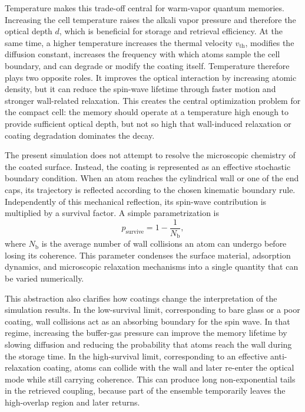 Temperature makes this trade-off central for warm-vapor quantum memories. Increasing the cell temperature raises the alkali vapor pressure and therefore the optical depth \(d\), which is beneficial for storage and retrieval efficiency. At the same time, a higher temperature increases the thermal velocity \(v_{\mathrm{th}}\), modifies the diffusion constant, increases the frequency with which atoms sample the cell boundary, and can degrade or modify the coating itself. Temperature therefore plays two opposite roles. It improves the optical interaction by increasing atomic density, but it can reduce the spin-wave lifetime through faster motion and stronger wall-related relaxation. This creates the central optimization problem for the compact cell: the memory should operate at a temperature high enough to provide sufficient optical depth, but not so high that wall-induced relaxation or coating degradation dominates the decay.

The present simulation does not attempt to resolve the microscopic chemistry of the coated surface. Instead, the coating is represented as an effective stochastic boundary condition. When an atom reaches the cylindrical wall or one of the end caps, its trajectory is reflected according to the chosen kinematic boundary rule. Independently of this mechanical reflection, its spin-wave contribution is multiplied by a survival factor. A simple parametrization is
\begin{equation}
    p_{\mathrm{survive}}
    =
    1 - \frac{1}{N_{\text{b}}},
    \label{eq:survival_probability}
\end{equation}
where \(N_{\text{b}}\) is the average number of wall collisions an atom can undergo before losing its coherence. This parameter condenses the surface material, adsorption dynamics, and microscopic relaxation mechanisms into a single quantity that can be varied numerically.

This abstraction also clarifies how coatings change the interpretation of the simulation results. In the low-survival limit, corresponding to bare glass or a poor coating, wall collisions act as an absorbing boundary for the spin wave. In that regime, increasing the buffer-gas pressure can improve the memory lifetime by slowing diffusion and reducing the probability that atoms reach the wall during the storage time. In the high-survival limit, corresponding to an effective anti-relaxation coating, atoms can collide with the wall and later re-enter the optical mode while still carrying coherence. This can produce long non-exponential tails in the retrieved coupling, because part of the ensemble temporarily leaves the high-overlap region and later returns.


